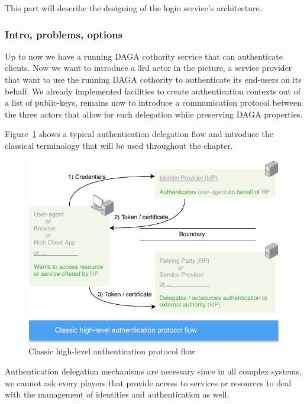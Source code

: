 
    This part will describe the designing of the login service's architecture.

    \subsubsection{Intro, problems, options}
    Up to now we have a running DAGA cothority service that can authenticate clients.
    Now we want to introduce a 3rd actor in the picture, a service provider that want to use the running DAGA cothority to
    authenticate its end-users on its behalf.
    We already implemented facilities to create authentication contexts out of a list of public-keys, remains now to
    introduce a communication protocol between the three actors that allow for such delegation while preserving
    DAGA properties.

    Figure~\ref{fig:signin} shows a typical authentication delegation flow and introduce the classical terminology that will be used throughout the chapter.
    \begin{figure}
        \includegraphics[width=\linewidth]{images/signIn.pdf}
        \caption{Classic high-level authentication protocol flow}
        \label{fig:signin}
    \end{figure}

    Authentication delegation mechanisms are necessary since in all complex systems, we cannot ask every players that provide
    access to services or resources to deal with the management of identities and authentication as well.

